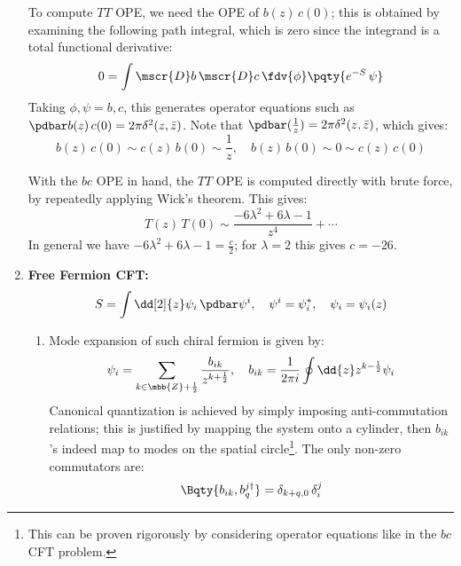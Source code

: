 \documentclass[a4paper,10pt]{article}
\begin{document}
\begin{enumerate}
	To compute $TT$ OPE, we need the OPE of $b(z)\,c(0)$; this is obtained by examining the following path integral, which is zero since the integrand is a total functional derivative:
	\begin{equation}
		0 = \int \mscr{D}b\,\mscr{D}c\,
			\fdv{\phi}\pqty{e^{-S}\,\psi}
	\end{equation}
	Taking $\phi,\psi=b,c$, this generates operator equations such as $
		\pdbar b(z)\,c(0)
		= 2\pi\delta^2(z,\bar{z})
	$. Note that $
		\pdbar(\frac{1}{z})
		= 2\pi\delta^2(z,\bar{z})
	$, which gives:
	\begin{equation}
		b(z)\,c(0) \sim c(z)\,b(0)
		\sim \frac{1}{z},\quad
		b(z)\,b(0) \sim 0
		\sim c(z)\,c(0)
	\end{equation}
	
	With the $bc$ OPE in hand, the $TT$ OPE is computed directly with brute force, by repeatedly applying Wick's theorem. This gives:
	\begin{equation}
		T(z)\,T(0)
		\sim \frac{
			-6\lambda^2 + 6\lambda - 1
		}{z^4} + \cdots
	\end{equation}
	In general we have $
		-6\lambda^2 + 6\lambda - 1
		= \frac{c}{2}
	$; for $\lambda = 2$ this gives $c = -26$. 
	\qedfull
	
	\item \textbf{Free Fermion CFT:}
	\begin{equation}
		S = \int \dd[2]{z}
			\psi_i\,\pdbar\psi^i,\quad
		\psi^i = \psi_i^*,\quad
		\psi_i = \psi_i(z)
	\end{equation}
	
	\begin{enumerate}
	\item Mode expansion of such chiral fermion is given by:
	\begin{equation}
		\psi_i = \sum_{
			k\in\mbb{Z}+\frac{1}{2}
		} \frac{b_{ik}}{z^{k+\frac{1}{2}}},\quad
		b_{ik}
		= \frac{1}{2\pi i} \oint \dd{z}
			z^{k-\frac{1}{2}} \psi_i
	\end{equation}
	Canonical quantization is achieved by simply imposing anti-commutation relations; this is justified by mapping the system onto a cylinder, then $b_{ik}$'s indeed map to modes on the spatial circle\footnote{
		This can be proven rigorously by considering operator equations like in the $bc$ CFT problem. 
	}. The only non-zero commutators are:
	\begin{equation}
		\Bqty{b_{ik},b^{j\dagger}_q}
		= \delta_{k+q,0}\,\delta^j_i
	\end{equation}
	

\end{enumerate}
\end{enumerate}
\end{document}
